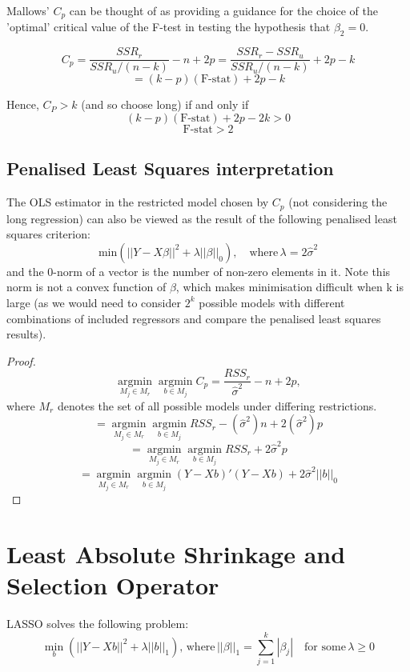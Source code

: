 \documentclass[DIV=14,titlepage=false]{scrreprt}
\begin{document}
Mallows' \(C_p\) can be thought of as providing a guidance for the choice of the 'optimal' critical value of the F-test in testing the hypothesis that \(\beta_2=0\).

\[C_p=\frac{SSR_r}{SSR_u/(n-k)}-n+2p=\frac{SSR_r-SSR_u}{SSR_u/(n-k)}+2p-k\]
\[=(k-p)(\text{F-stat})+2p-k\]


Hence, \(C_P>k\) (and so choose long) if and only if
\[(k-p)(\text{F-stat})+2p-2k>0\]
\[\text{F-stat}>2\]

\subsection{Penalised Least Squares interpretation}

\begin{prop}
The OLS estimator in the restricted model chosen by \(C_p\) (not considering the long regression) can also be viewed as the result of the following penalised least squares criterion:
\[\text{min} (||Y-X\beta||^2+\lambda||\beta||_0), \quad \text{where} \, \lambda=2\hat{\sigma}^2\]
and the 0-norm of a vector is the number of non-zero elements in it. Note this norm is not a convex function of \(\beta\), which makes minimisation difficult when k is large (as we would need to consider \(2^k\) possible models with different combinations of included regressors and compare the penalised least squares results).
\end{prop}
\vspace{5mm}
\begin{proof}
    \[\operatorname*{argmin}_{M_j\in M_r}\operatorname*{argmin}_{b\in M_j}C_p=\frac{RSS_r}{\hat\sigma^2}-n+2p,\]
    where \(M_r\) denotes the set of all possible models under differing restrictions.
    \[=\operatorname*{argmin}_{M_j\in M_r}\operatorname*{argmin}_{b\in M_j}{RSS_r}-(\hat\sigma^2)n+2(\hat\sigma^2)p\]
    \[=\operatorname*{argmin}_{M_j\in M_r}\operatorname*{argmin}_{b\in M_j}{RSS_r}+2\hat\sigma^2p\]
    \[=\operatorname*{argmin}_{M_j\in M_r}\operatorname*{argmin}_{b\in M_j}(Y-Xb)'(Y-Xb)+2\hat\sigma^2||b||_0\]
\end{proof}

\section{Least Absolute Shrinkage and Selection Operator}

\begin{definition}
    LASSO solves the following problem:
    \[\operatorname*{min}_b (||Y-Xb||^2+\lambda||b||_1),\, \text{where}\, ||\beta||_1 =\sum_{j=1}^{k}|\beta_j| \quad \text{for some} \, \lambda\geq0\]
\end{definition}
\end{document}
